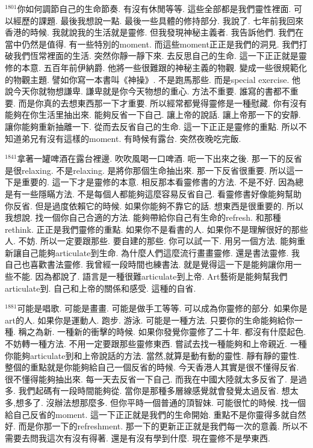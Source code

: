 \documentclass{book}
\begin{document}
$^{1801}$你如何調節自己的生命節奏.
有沒有休閒等等.
這些全部都是我們靈性裡面.
可以經歷的課題.
最後我想說一點.
最後一些具體的修持部分.
我說了.
七年前我回來香港的時候.
我就說我的生活就是靈修.
但我發現神秘主義者.
我告訴他們.
我們在當中仍然是值得.
有一些特別的moment.
而這些moment正正是我們的洞見.
我們打破我們恆常裡面的生活.
突然你靜一靜下來.
去反思自己的生命.
這一下正正就是靈修的本意.
五百年前伊納爵.
他將一些很難跟的神秘主義的物觀.
變成一些很規範化的物觀主題.
譬如你寫一本書叫《神操》.
不是跑馬那些.
而是special exercise.
他說今天你就物想謙卑.
謙卑就是你今天物想的重心.
方法不重要.
誰寫的書都不重要.
而是你真的去想東西那一下才重要.
所以經常都覺得靈修是一種慰藏.
你有沒有能夠在你生活里抽出來.
能夠反省一下自己.
讓上帝的說話.
讓上帝那一下的安靜.
讓你能夠重新抽離一下.
從而去反省自己的生命.
這一下正正是靈修的重點.
所以不知道弟兄有沒有這樣的moment.
有時候有露台.
突然夜晚吃完飯.

$^{1841}$拿著一罐啤酒在露台裡邊.
吹吹風喝一口啤酒.
呃一下出來之後.
那一下的反省是很relaxing.
不是relaxing.
是將你那個生命抽出來.
那一下反省很重要.
所以這一下是重要的.
這一下才是靈修的本意.
相反那本看靈修書的方法.
不是不好.
因為總是有一些隱瞞方法.
不是每個人都能夠這麼容易反省自己.
看靈修書好像能夠幫助你反省.
但是過度依賴它的時候.
如果你能夠不靠它的話.
想東西是很重要的.
所以我想說.
找一個你自己合適的方法.
能夠帶給你自己有生命的refresh.
和那種rethink.
正正是我們靈修的重點.
如果你不是看書的人.
如果你不是理解很好的那些人.
不妨.
所以一定要跟那些.
要自建的那些.
你可以試一下.
用另一個方法.
能夠重新讓自己能夠articulate到生命.
為什麼人們這麼流行畫畫靈修.
還是書法靈修.
我自己也喜歡書法靈修.
我曾經一段時間也練書法.
就是覺得這一下是能夠讓你用一些不能.
因為都說了.
語言是一種很難articulate到上帝.
Art藝術是能夠幫我們articulate到.
自己和上帝的關係和感受.
這種的自省.

$^{1881}$可能是唱歌.
可能是畫畫.
可能是做手工等等.
可以成為你靈修的部分.
如果你是art的人.
如果你是運動人.
跑步.
游泳.
可能是一種方法.
只要你的生命能夠給你一種.
稱之為新.
一種新的衝擊的時候.
如果你發覺你靈修了二十年.
都沒有什麼起色.
不妨轉一種方法.
不用一定要跟那些靈修東西.
嘗試去找一種能夠和上帝親近.
一種你能夠articulate到和上帝說話的方法.
當然,就算是動有動的靈性.
靜有靜的靈性.
整個的重點就是你能夠給自己一個反省的時候.
今天香港人其實是很不懂得反省.
很不懂得能夠抽出來.
每一天去反省一下自己.
而我在中國大陸就太多反省了.
是過多.
我們起碼有一段時間能夠從.
當你是那種多層線感覺就會發覺太過反省.
想太多,想多了.
沒辦法想那麼多.
但你平時一個普通的頂智妹.
可能很忙的時候.
找一個給自己反省的moment.
這一下正正就是我們的生命開始.
重點不是你靈得多就自然好.
而是你那一下的refreshment.
那一下的更新正正就是我們每一次的意義.
所以不需要去問我這次有沒有得著.
還是有沒有學到什麼.
現在靈修不是學東西.
\end{document}
